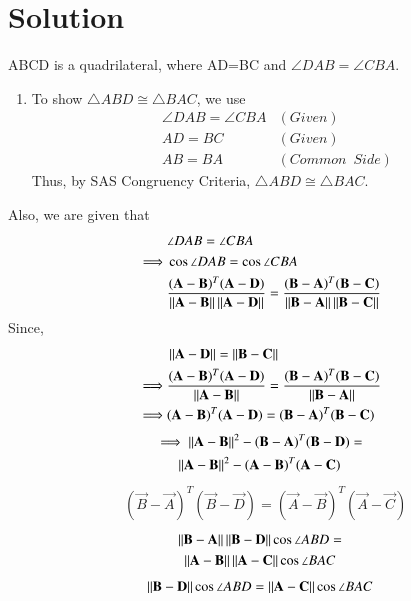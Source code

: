 \documentclass[journal,12pt,twocolumn]{IEEEtran}
\begin{document}
\section{Solution}
ABCD is a quadrilateral, where AD=BC and $\angle DAB= \angle CBA$.
\begin{enumerate}
\item To show $\triangle ABD \cong \triangle BAC$, we use
\begin{align}
	& \angle DAB = \angle CBA & (Given) \\
	& AD = BC & (Given) \\
	& AB = BA & (Common \enspace Side)
\end{align}
Thus, by SAS Congruency Criteria, $\triangle ABD \cong \triangle BAC$.
\end{enumerate}
Also, we are given that
\begin{align}
 & \angle DAB  =  \angle CBA \\
 \implies &\cos\angle DAB  =  \cos\angle CBA \\
 &  \frac{(\mathbf A -\mathbf B)^T(\mathbf{A}-\mathbf{D})}{\left\lVert\mathbf{A}-\mathbf{B}\right\rVert \left\lVert\mathbf{A}-\mathbf{D}\right\rVert } = \frac{(\mathbf B -\mathbf A)^T(\mathbf{B}-\mathbf{C})}{\left\lVert\mathbf{B}-\mathbf{A}\right\rVert \left\lVert\mathbf{B}-\mathbf{C}\right\rVert}
 \end{align}
Since,
\begin{align}
	& \left\lVert\mathbf{A}-\mathbf{D}\right\rVert  =  \left\lVert\mathbf{B}-\mathbf{C}\right\rVert \\
	\implies & \frac{(\mathbf A -\mathbf B)^T(\mathbf{A}-\mathbf{D})}{\left\lVert\mathbf{A}-\mathbf{B}\right\rVert} = \frac{(\mathbf B -\mathbf A)^T(\mathbf{B}-\mathbf{C})}{\left\lVert\mathbf{B}-\mathbf{A}\right\rVert} \\
    \implies & (\mathbf A -\mathbf B)^T(\mathbf{A}-\mathbf{D}) =  (\mathbf B -\mathbf A)^T(\mathbf{B}-\mathbf{C})
\end{align}
\begin{multline}
 \implies \left\lVert\mathbf{A}-\mathbf{B}\right\rVert^2 - (\mathbf B -\mathbf A)^T(\mathbf{B}-\mathbf{D})  =\\ \left\lVert\mathbf{A}-\mathbf{B}\right\rVert^2 - (\mathbf A -\mathbf B)^T(\mathbf{A}-\mathbf{C}) 
\end{multline}
\begin{align}
& (\vec B -\vec A)^T(\vec{B}-\vec{D}) = (\vec A -\vec B)^T(\vec{A}-\vec{C})\label{1}
\end{align}
\begin{multline}
 \left\lVert\mathbf{B} - \mathbf{A}\right\rVert\left\lVert\mathbf{B} - \mathbf{D}\right\rVert\cos\angle ABD  = \\ \left\lVert\mathbf{A} - \mathbf{B}\right\rVert\left\lVert\mathbf{A} - \mathbf{C}\right\rVert\cos\angle BAC 	
\end{multline}
\begin{align}
 \left\lVert\mathbf{B} - \mathbf{D}\right\rVert\cos\angle ABD  = \left\lVert\mathbf{A} - \mathbf{C}\right\rVert\cos\angle BAC \label{2}
\end{align}
\end{document}
